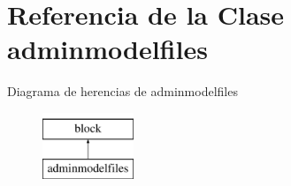 \hypertarget{classadminmodelfiles}{\section{\-Referencia de la \-Clase adminmodelfiles}
\label{classadminmodelfiles}
}
\-Diagrama de herencias de adminmodelfiles\begin{figure}[H]
\begin{center}
\leavevmode
\includegraphics[height=2.000000cm]{classadminmodelfiles}
\end{center}
\end{figure}

